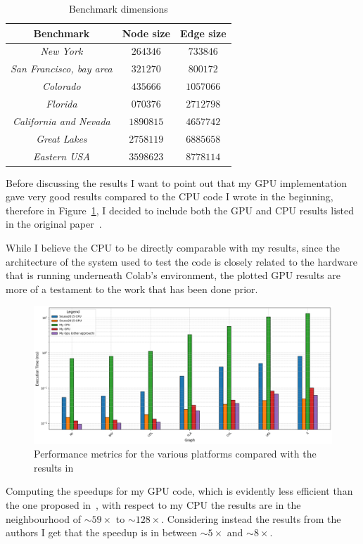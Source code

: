 \documentclass[a4paper,10pt]{article}
\begin{document}
\begin{longtable}{|c|c|c|}
	\caption{Benchmark dimensions}\label{tbl:benchmarks}
	\\\hline\textbf{Benchmark} & \textbf{Node size} & \textbf{Edge size} \\\hline\hline
	\endfirsthead\hline\endlastfoot

	\textit{New York}                & $\num{264346}$   & $\num{733846}$  \\\hline
	\textit{San Francisco, bay area} & $\num{321270}$   & $\num{800172}$  \\\hline
	\textit{Colorado}                & $\num{435666}$   & $\num{1057066}$ \\\hline
	\textit{Florida}                 & $\num{ 070376}$  & $\num{2712798}$ \\\hline
	\textit{California and Nevada}   & $\num{ 1890815}$ & $\num{4657742}$ \\\hline
	\textit{Great Lakes}             & $\num{2758119}$  & $\num{6885658}$ \\\hline
	\textit{Eastern USA}             & $\num{3598623}$  & $\num{8778114}$
\end{longtable}
Before discussing the results I want to point out that my GPU implementation gave very good results compared to the CPU code I wrote in the beginning, therefore in Figure~\ref{fig:results}, I decided to include both the GPU and CPU results listed in the original paper~\cite{generic-he-boruvka}.

While I believe the CPU to be directly comparable with my results, since the architecture of the system used to test the code is closely related to the hardware that is running underneath Colab's environment, the plotted GPU results are more of a testament to the work that has been done prior.
\begin{figure}
	\centering
	\includegraphics[scale=0.4]{fig/benchmarks.png}
	\caption{Performance metrics for the various platforms compared with the results in \cite{generic-he-boruvka}}
	\label{fig:results}
\end{figure}
Computing the speedups for my GPU code, which is evidently less efficient than the one proposed in~\cite{generic-he-boruvka}, with respect to my CPU the results are in the neighbourhood of $\sim59\times$ to $\sim128\times$. Considering instead the results from the authors I get that the speedup is in between $\sim5\times$ and $\sim8\times$.
\end{document}

